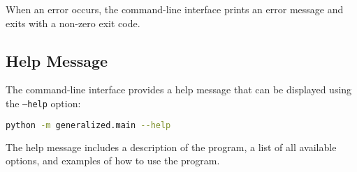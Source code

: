When an error occurs, the command-line interface prints an error message and exits with a non-zero exit code.

\subsection{Help Message}

The command-line interface provides a help message that can be displayed using the \texttt{--help} option:

\begin{lstlisting}[language=bash]
python -m generalized.main --help
\end{lstlisting}

The help message includes a description of the program, a list of all available options, and examples of how to use the program.
